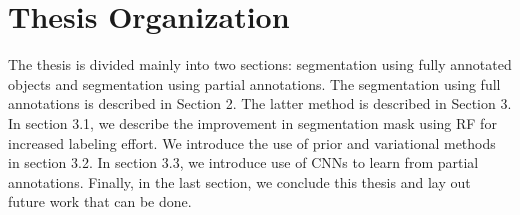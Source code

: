 \section{Thesis Organization}
The thesis is divided mainly into two sections: segmentation using fully annotated objects and segmentation using partial annotations. The segmentation using full annotations is described in Section 2. The latter method is described in Section 3. In section 3.1, we describe the improvement in segmentation mask using RF for increased labeling effort. We introduce the use of prior and variational methods in section 3.2. In section 3.3, we introduce use of CNNs to learn from partial annotations. Finally, in the last section, we conclude this thesis and lay out future work that can be done.


